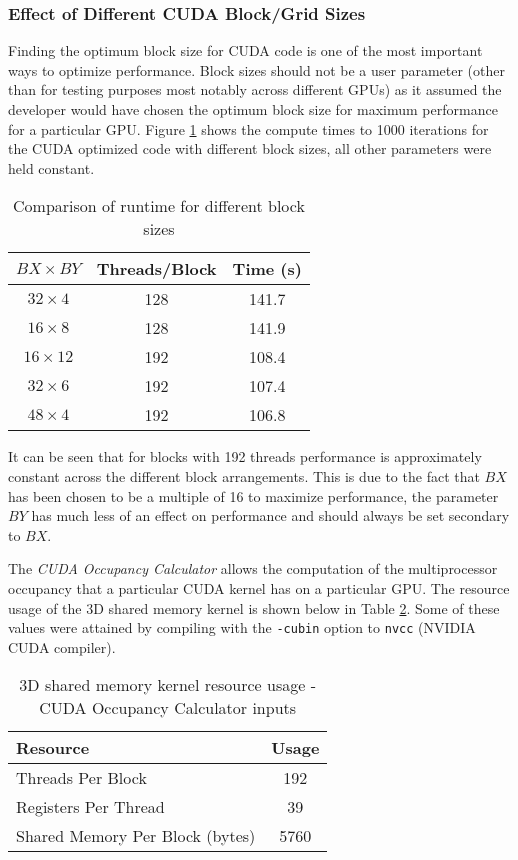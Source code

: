 \subsubsection{Effect of Different CUDA Block/Grid Sizes}\label{blocksizes}

Finding the optimum block size for CUDA code is one of the most important ways to optimize performance. Block sizes should not be a user parameter (other than for testing purposes most notably across different GPUs) as it assumed the developer would have chosen the optimum block size for maximum performance for a particular GPU. Figure \ref{table:blocksizes} shows the compute times to 1000 iterations for the CUDA optimized code with different block sizes, all other parameters were held constant. 

\begin{table}[h]
\centering
\begin{tabular}{ | c | c | c | }
	\hline
	$BX \times BY$  & Threads/Block & Time (s) \\ \hline
  $32 \times 4$	 &128			& 141.7 \\
  $16 \times 8$	 &128			& 141.9 \\
  $16 \times 12$ &192 & 108.4 \\
  $32 \times 6$	 &192   & 107.4  \\
  $48 \times 4$	 &192  & 106.8  \\
  \hline
\end{tabular}\caption{Comparison of runtime for different block sizes}
\label{table:blocksizes}
\end{table}

It can be seen that for blocks with 192 threads performance is approximately constant across the different block arrangements. This is due to the fact that $BX$ has been chosen to be a multiple of 16 to maximize performance, the parameter $BY$ has much less of an effect on performance and should always be set secondary to $BX$. 

The \textit{CUDA Occupancy Calculator} allows the computation of the multiprocessor occupancy that a particular CUDA kernel has on a particular GPU. The resource usage of the 3D shared memory kernel is shown below in Table \ref{table:occupancy}. Some of these values were attained by compiling with the \texttt{-cubin} option to \texttt{nvcc} (NVIDIA CUDA compiler).

\begin{table}[h]
\centering
\begin{tabular}{ | l | c | }
	\hline
	Resource  											 & Usage \\ \hline
  Threads Per Block	 								& 192 \\
  Registers Per Thread 						 	& 39 \\
  Shared Memory Per Block (bytes)  & 5760 \\
  \hline
\end{tabular}\caption{3D shared memory kernel resource usage - CUDA Occupancy Calculator inputs}
\label{table:occupancy}
\end{table}

